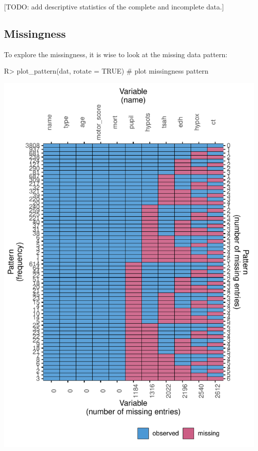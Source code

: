 \documentclass[
]{jss}
\begin{document}
{[}TODO: add descriptive statistics of the complete and incomplete
data.{]}

\hypertarget{missingness}{%
\subsection{Missingness}\label{missingness}}

To explore the missingness, it is wise to look at the missing data
pattern:

\begin{CodeChunk}
\begin{CodeInput}
R> plot_pattern(dat, rotate = TRUE)  # plot missingness pattern
\end{CodeInput}


\begin{center}\includegraphics{Imputation_of_Incomplete_Multilevel_Data_files/figure-latex/pattern-1} \end{center}

\end{CodeChunk}
\end{document}
